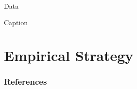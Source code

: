 \documentclass [xcolor=svgnames, t] {beamer}
\begin{document}
\begin{frame}{Data}
\begin{table}[H]
    \centering
    \tiny
    
    \caption{Caption}
    \label{tab:my_label}
\end{table}
\end{frame}






\section{Empirical Strategy}
    

\begin{frame} [allowframebreaks]\frametitle{References}
               
        
        
\end{frame}
\end{document}
